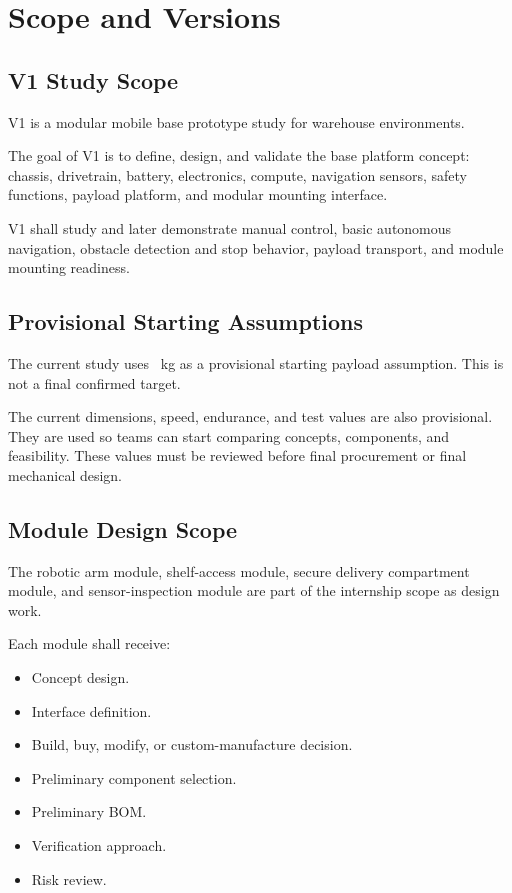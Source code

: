 \chapter{Scope and Versions}

\section{V1 Study Scope}

V1 is a modular mobile base prototype study for warehouse environments.

The goal of V1 is to define, design, and validate the base platform concept: chassis, drivetrain, battery, electronics, compute, navigation sensors, safety functions, payload platform, and modular mounting interface.

V1 shall study and later demonstrate manual control, basic autonomous navigation, obstacle detection and stop behavior, payload transport, and module mounting readiness.

\section{Provisional Starting Assumptions}

The current study uses \SpecBaseRobotRatedPayloadKg~kg as a provisional starting payload assumption. This is not a final confirmed target.

The current dimensions, speed, endurance, and test values are also provisional. They are used so teams can start comparing concepts, components, and feasibility. These values must be reviewed before final procurement or final mechanical design.


\section{Module Design Scope}

The robotic arm module, shelf-access module, secure delivery compartment module, and sensor-inspection module are part of the internship scope as design work.

Each module shall receive:

\begin{itemize}
    \item Concept design.
    \item Interface definition.
    \item Build, buy, modify, or custom-manufacture decision.
    \item Preliminary component selection.
    \item Preliminary BOM.
    \item Verification approach.
    \item Risk review.
\end{itemize}

